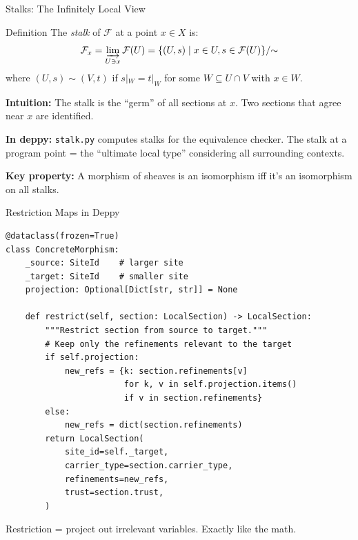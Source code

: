 \documentclass[aspectratio=169,10pt]{beamer}
\newcommand{\Fscr}{\mathcal{F}}
\begin{document}
\begin{frame}{Stalks: The Infinitely Local View}
\begin{block}{Definition}
The \emph{stalk} of $\Fscr$ at a point $x \in X$ is:
\[
\Fscr_x = \varinjlim_{U \ni x} \Fscr(U) = \{(U, s) \mid x \in U, s \in \Fscr(U)\} / {\sim}
\]
where $(U, s) \sim (V, t)$ if $s|_W = t|_W$ for some $W \subseteq U \cap V$ with $x \in W$.
\end{block}

\textbf{Intuition:} The stalk is the ``germ'' of all sections at $x$. Two sections that agree near $x$ are identified.

\vspace{0.3em}
\textbf{In deppy:} \texttt{stalk.py} computes stalks for the equivalence checker.
The stalk at a program point = the ``ultimate local type'' considering all surrounding contexts.

\vspace{0.3em}
\textbf{Key property:} A morphism of sheaves is an isomorphism iff it's an isomorphism on all stalks.
\end{frame}

\begin{frame}[fragile]{Restriction Maps in Deppy}
\begin{lstlisting}
@dataclass(frozen=True)
class ConcreteMorphism:
    _source: SiteId    # larger site
    _target: SiteId    # smaller site
    projection: Optional[Dict[str, str]] = None

    def restrict(self, section: LocalSection) -> LocalSection:
        """Restrict section from source to target."""
        # Keep only the refinements relevant to the target
        if self.projection:
            new_refs = {k: section.refinements[v]
                        for k, v in self.projection.items()
                        if v in section.refinements}
        else:
            new_refs = dict(section.refinements)
        return LocalSection(
            site_id=self._target,
            carrier_type=section.carrier_type,
            refinements=new_refs,
            trust=section.trust,
        )
\end{lstlisting}

Restriction = project out irrelevant variables. Exactly like the math.
\end{frame}
\end{document}
